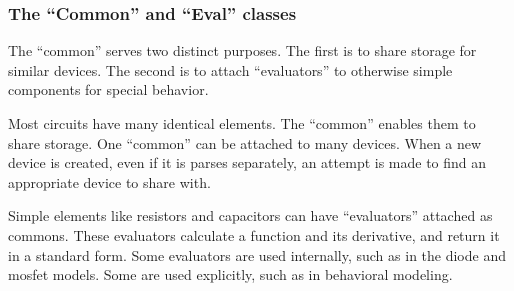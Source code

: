 \subsubsection{The ``Common'' and ``Eval'' classes}

The ``common'' serves two distinct purposes.  The first is to share
storage for similar devices.  The second is to attach ``evaluators''
to otherwise simple components for special behavior.

Most circuits have many identical elements.  The ``common'' enables
them to share storage.  One ``common'' can be attached to many
devices.  When a new device is created, even if it is parses
separately, an attempt is made to find an appropriate device to share
with.

Simple elements like resistors and capacitors can have ``evaluators''
attached as commons.  These evaluators calculate a function and its
derivative, and return it in a standard form.  Some evaluators are
used internally, such as in the diode and mosfet models.  Some are
used explicitly, such as in behavioral modeling.
